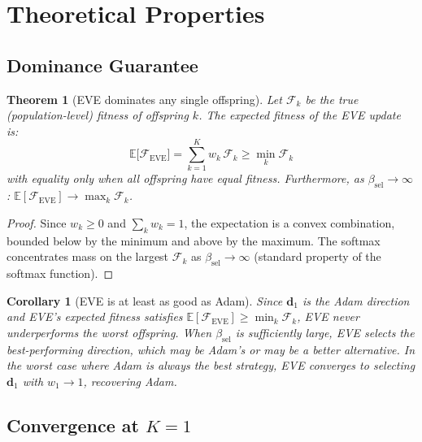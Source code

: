 \documentclass[12pt]{article}
\newtheorem{theorem}{Theorem}
\newtheorem{corollary}{Corollary}
\newcommand{\E}{\mathbb{E}}
\begin{document}
\section{Theoretical Properties}
\label{sec:theory}

\subsection{Dominance Guarantee}

\begin{theorem}[EVE dominates any single offspring]
\label{thm:dominance}
Let $\mathcal{F}_k$ be the true (population-level) fitness of offspring
$k$.
The expected fitness of the EVE update is:
\begin{equation}
  \E\bigl[\mathcal{F}_{\mathrm{EVE}}\bigr]
  = \sum_{k=1}^K w_k\,\mathcal{F}_k
  \geq \min_{k} \mathcal{F}_k
  \label{eq:dominance}
\end{equation}
with equality only when all offspring have equal fitness.
Furthermore, as $\beta_{\mathrm{sel}} \to \infty$:
$\E[\mathcal{F}_{\mathrm{EVE}}] \to \max_k \mathcal{F}_k$.
\end{theorem}

\begin{proof}
Since $w_k \geq 0$ and $\sum_k w_k = 1$, the expectation is a
convex combination, bounded below by the minimum and above by the
maximum.
The softmax concentrates mass on the largest $\mathcal{F}_k$ as
$\beta_{\mathrm{sel}} \to \infty$ (standard property of the softmax
function).
\end{proof}

\begin{corollary}[EVE is at least as good as Adam]
Since $\mathbf{d}_1$ is the Adam direction and EVE's expected fitness
satisfies $\E[\mathcal{F}_{\mathrm{EVE}}] \geq \min_k \mathcal{F}_k$,
EVE never underperforms the worst offspring.
When $\beta_{\mathrm{sel}}$ is sufficiently large, EVE selects the
best-performing direction, which may be Adam's or may be a better
alternative.
In the worst case where Adam is always the best strategy, EVE converges
to selecting $\mathbf{d}_1$ with $w_1 \to 1$, recovering Adam.
\end{corollary}

\subsection{Convergence at $K = 1$}
\end{document}
